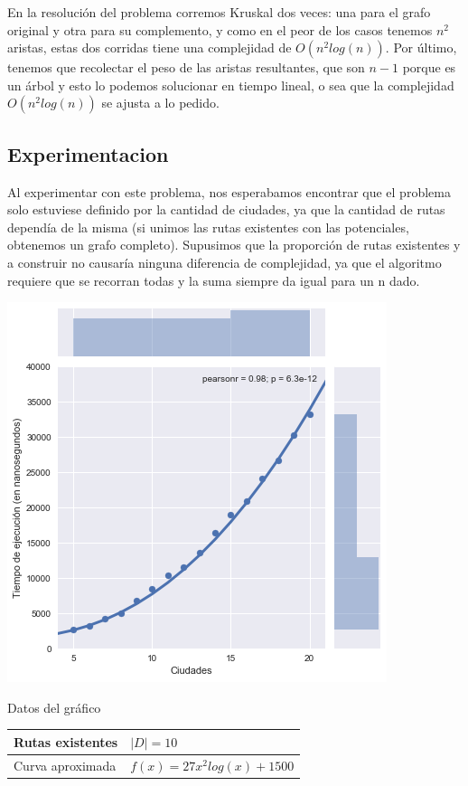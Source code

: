 En la resolución del problema corremos Kruskal dos veces: una para el grafo original y otra para su complemento, y como en el peor de los casos tenemos $n^2$ aristas, estas dos corridas tiene una complejidad de $O(n^2log(n))$. Por último, tenemos que recolectar el peso de las aristas resultantes, que son $n-1$ porque es un árbol y esto lo podemos solucionar en tiempo lineal, o sea que la complejidad $O(n^2log(n))$ se ajusta a lo pedido.


\subsection{Experimentacion}

Al experimentar con este problema, nos esperabamos encontrar que el problema solo estuviese definido por la cantidad de ciudades, ya que la cantidad de rutas dependía de la misma (si unimos las rutas existentes con las potenciales, obtenemos un grafo completo). Supusimos que la proporción de rutas existentes y a construir no causaría ninguna diferencia de complejidad, ya que el algoritmo requiere que se recorran todas y la suma siempre da igual para un n dado.

\noindent
\begin{minipage}{0.55\textwidth}
	\hfill
	\includegraphics[scale=0.60]{imagenes/ej3-1.png}
\end{minipage}
\hfill
\begin{minipage}{0.44\textwidth}
	\begin{center}
		Datos del gráfico

		\begin{tabular}{ | l l |}
			\hline
			Rutas existentes & $| D | = 10$ \\ \hline
			Curva aproximada & $f(x) = 27 x^2 log(x) + 1500$ \\
			\hline
		\end{tabular}
	\end{center}
\end{minipage}

